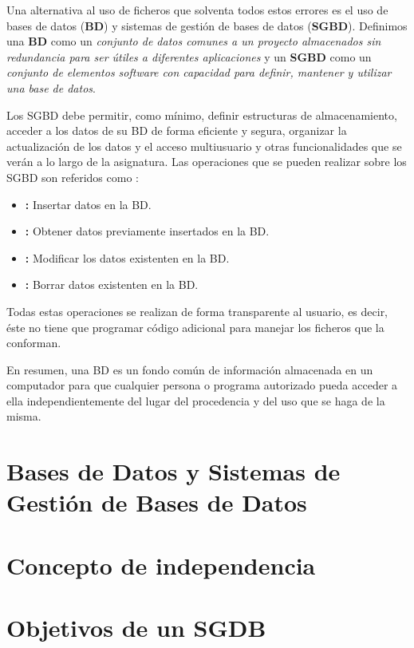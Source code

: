 Una alternativa al uso de ficheros que solventa todos estos errores es el uso de bases de datos (\textbf{BD}) y sistemas de gestión de bases de datos (\textbf{SGBD}).
Definimos una \textbf{BD} como un \textit{conjunto de datos comunes a un proyecto almacenados sin redundancia para ser útiles a diferentes aplicaciones} y un \textbf{SGBD} como un \textit{conjunto de elementos software con capacidad para definir, mantener y utilizar una base de datos}.

Los SGBD debe permitir, como mínimo, definir estructuras de almacenamiento, acceder a los datos de su BD de forma eficiente y segura, organizar la actualización de los datos y el acceso multiusuario y otras funcionalidades que se verán a lo largo de la asignatura. Las operaciones que se pueden realizar sobre los SGBD son referidos como :

\begin{itemize}
	\item{}\textbf{:} Insertar datos en la BD.
	\item{}\textbf{:} Obtener datos previamente insertados en la BD.
	\item{}\textbf{:} Modificar los datos existenten en la BD.
	\item{}\textbf{:} Borrar datos existenten en la BD.
\end{itemize}

Todas estas operaciones se realizan de forma transparente al usuario, es decir, éste no tiene que programar código adicional para manejar los ficheros que la conforman.

En resumen, una BD es un fondo común de información almacenada en un computador para que cualquier persona o programa autorizado pueda acceder a ella independientemente del lugar del procedencia y del uso que se haga de la misma.

\section{Bases de Datos y Sistemas de Gestión de Bases de Datos}

\section{Concepto de independencia}

\section{Objetivos de un SGDB}
